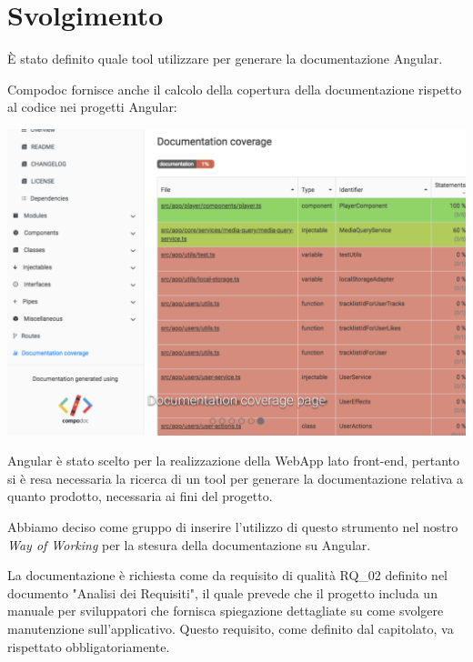 \section{Svolgimento}

È stato definito quale tool utilizzare per generare la documentazione Angular.

Compodoc fornisce anche il calcolo della copertura della documentazione rispetto al codice nei progetti Angular:

\includegraphics[width = 0.9\linewidth]{img/compodoc.png}

Angular è stato scelto per la realizzazione della WebApp lato front-end, pertanto si è resa necessaria la ricerca di un tool per generare la documentazione relativa a quanto prodotto, necessaria ai fini del progetto.

Abbiamo deciso come gruppo di inserire l'utilizzo di questo strumento nel nostro {\it{Way of Working}} per la stesura della documentazione su Angular.

La documentazione è richiesta come da requisito di qualità RQ\_02 definito nel documento "Analisi dei Requisiti", il quale prevede che il progetto includa un manuale per sviluppatori che fornisca spiegazione dettagliate su come svolgere manutenzione sull'applicativo. Questo requisito, come definito dal capitolato, va rispettato obbligatoriamente.